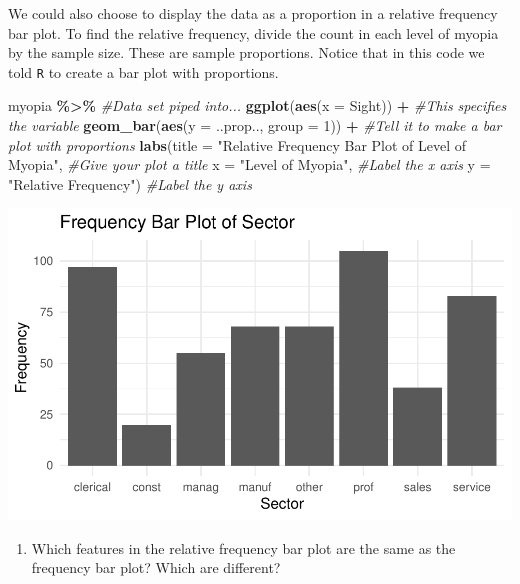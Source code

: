 \documentclass[
]{report}
\newenvironment{Shaded}{\begin{snugshade}}{\end{snugshade}}
\newcommand{\CommentTok}[1]{\textcolor[rgb]{0.56,0.35,0.01}{\textit{#1}}}
\newcommand{\DataTypeTok}[1]{\textcolor[rgb]{0.13,0.29,0.53}{#1}}
\newcommand{\DecValTok}[1]{\textcolor[rgb]{0.00,0.00,0.81}{#1}}
\newcommand{\KeywordTok}[1]{\textcolor[rgb]{0.13,0.29,0.53}{\textbf{#1}}}
\newcommand{\NormalTok}[1]{#1}
\newcommand{\OperatorTok}[1]{\textcolor[rgb]{0.81,0.36,0.00}{\textbf{#1}}}
\newcommand{\StringTok}[1]{\textcolor[rgb]{0.31,0.60,0.02}{#1}}
\providecommand{\tightlist}{%
  \setlength{\itemsep}{0pt}\setlength{\parskip}{0pt}}
\begin{document}
\vspace{0.3in}

We could also choose to display the data as a proportion in a relative frequency bar plot. To find the relative frequency, divide the count in each level of myopia by the sample size. These are sample proportions. Notice that in this code we told \texttt{R} to create a bar plot with proportions.

\begin{Shaded}
\begin{Highlighting}[]
\NormalTok{myopia }\OperatorTok{\%\textgreater{}\%}\StringTok{ }\CommentTok{\#Data set piped into...}
\KeywordTok{ggplot}\NormalTok{(}\KeywordTok{aes}\NormalTok{(}\DataTypeTok{x =}\NormalTok{ Sight)) }\OperatorTok{+}\StringTok{   }\CommentTok{\#This specifies the variable}
\StringTok{  }\KeywordTok{geom\_bar}\NormalTok{(}\KeywordTok{aes}\NormalTok{(}\DataTypeTok{y =}\NormalTok{ ..prop.., }\DataTypeTok{group =} \DecValTok{1}\NormalTok{)) }\OperatorTok{+}\StringTok{  }\CommentTok{\#Tell it to make a bar plot with proportions}
\StringTok{  }\KeywordTok{labs}\NormalTok{(}\DataTypeTok{title =} \StringTok{"Relative Frequency Bar Plot of Level of Myopia"}\NormalTok{,  }\CommentTok{\#Give your plot a title}
       \DataTypeTok{x =} \StringTok{"Level of Myopia"}\NormalTok{,   }\CommentTok{\#Label the x axis}
       \DataTypeTok{y =} \StringTok{"Relative Frequency"}\NormalTok{)  }\CommentTok{\#Label the y axis}
\end{Highlighting}
\end{Shaded}

\begin{center}\includegraphics[width=0.5\linewidth]{03-EDA-categorical_files/figure-latex/unnamed-chunk-3-1} \end{center}

\begin{enumerate}
\def\labelenumi{\arabic{enumi}.}
\setcounter{enumi}{2}
\tightlist
\item
  Which features in the relative frequency bar plot are the same as the frequency bar plot? Which are different?
\end{enumerate}
\end{document}
